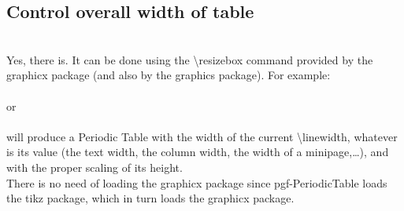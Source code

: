 \vfill%
\subsection{Control overall width of table}
%
\\ [6pt]Yes, there is. It can be done using the \textsf{\large\textbackslash resizebox} command provided by the graphicx package (and also by the graphics package). For example:
\\ [2pt]\tikz{\node[text width=\linewidth-8pt,inner xsep=4pt,align=left,fill=black!10,rounded corners=2pt] %
{\begin{minipage}{\linewidth}%
\begin{verbatim}
\resizebox{\linewidth}{!}{\pgfPT}
\end{verbatim}
\end{minipage}};}%
\\ or
\\ [2pt]\tikz{\node[text width=\linewidth-8pt,inner xsep=4pt,align=left,fill=black!10,rounded corners=2pt] %
{\begin{minipage}{\linewidth}%
\begin{verbatim}
\resizebox{\linewidth}{!}{\pgfPT[show title=false]}
\end{verbatim}
\end{minipage}};}%
\\ [2pt]will produce a Periodic Table with the width of the current \textsf{\large\textbackslash linewidth}, whatever is its value (the text width, the column width, the width of a minipage,\ldots), and with the proper scaling of its height.
\\ There is no need of loading the graphicx package since pgf-PeriodicTable loads the tikz package, which in turn loads the graphicx package.
\\ [2pt]%
